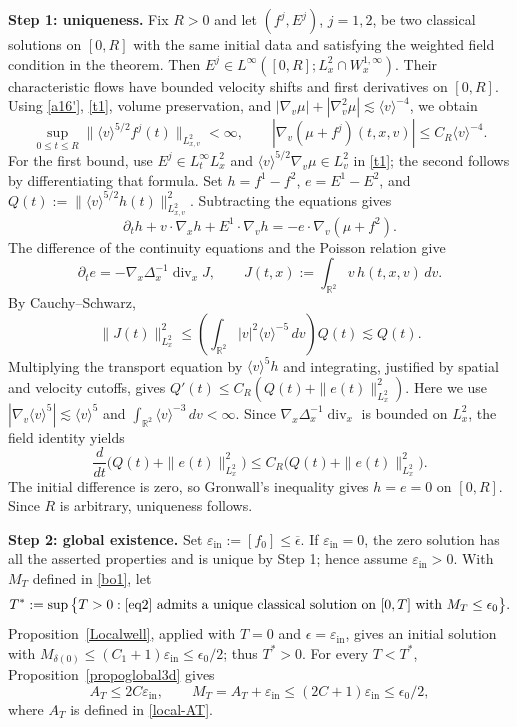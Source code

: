 \documentclass[reqno,11pt]{amsart}
\numberwithin{equation}{section}
\def\bar{\overline}
\def\bar{\overline}
\begin{document}
\textbf{Step 1: uniqueness.}
Fix $R>0$ and let $(f^j,E^j)$, $j=1,2$, be two classical solutions
on $[0,R]$ with the same initial data and satisfying the weighted
field condition in the theorem. Then
$E^j\in L^\infty([0,R];L_x^2\cap W_x^{1,\infty})$.
Their characteristic flows have bounded velocity shifts and first
derivatives on $[0,R]$. Using \eqref{a16'}, \eqref{t1}, volume
preservation, and
$|\nabla_v\mu|+|\nabla_v^2\mu|\lesssim\langle v\rangle^{-4}$, we obtain
\[
\sup_{0\leq t\leq R}
\|\langle v\rangle^{5/2}f^j(t)\|_{L^2_{x,v}}<\infty,
\qquad
|\nabla_v(\mu+f^j)(t,x,v)|\leq C_R\langle v\rangle^{-4}.
\]
For the first bound, use $E^j\in L^\infty_tL_x^2$ and
$\langle v\rangle^{5/2}\nabla_v\mu\in L_v^2$ in \eqref{t1};
the second follows by differentiating that formula. Set $h=f^1-f^2$, $e=E^1-E^2$, and
$Q(t):=\|\langle v\rangle^{5/2}h(t)\|_{L^2_{x,v}}^2$.
Subtracting the equations gives
\[
\partial_t h+v\cdot\nabla_xh+E^1\cdot\nabla_vh
=-e\cdot\nabla_v(\mu+f^2).
\]
The difference of the continuity equations and the Poisson relation give
\[
\partial_te=-\nabla_x\Delta_x^{-1}\operatorname{div}_xJ,
\qquad
J(t,x):=\int_{\mathbb R^2}v\,h(t,x,v)\,dv.
\]
By Cauchy--Schwarz,
\[
\|J(t)\|_{L_x^2}^2
\leq\left(\int_{\mathbb R^2}|v|^2\langle v\rangle^{-5}\,dv\right)Q(t)
\lesssim Q(t).
\]
Multiplying the transport equation by $\langle v\rangle^5h$ and
integrating, justified by spatial and velocity cutoffs, gives
$Q'(t)\leq C_R(Q(t)+\|e(t)\|_{L_x^2}^2)$.
Here we use $|\nabla_v\langle v\rangle^5|\lesssim\langle v\rangle^5$
and $\int_{\mathbb R^2}\langle v\rangle^{-3}\,dv<\infty$.
Since $\nabla_x\Delta_x^{-1}\operatorname{div}_x$ is bounded on $L_x^2$,
the field identity yields
\[
\frac{d}{dt}\bigl(Q(t)+\|e(t)\|_{L_x^2}^2\bigr)
\leq C_R\bigl(Q(t)+\|e(t)\|_{L_x^2}^2\bigr).
\]
The initial difference is zero, so Gronwall's inequality gives
$h=e=0$ on $[0,R]$. Since $R$ is arbitrary, uniqueness follows.
\medskip

\textbf{Step 2: global existence.}
Set $\varepsilon_{\mathrm{in}}:=[f_0]\leq\bar\epsilon$. If $\varepsilon_{\mathrm{in}}=0$, the zero solution has all
the asserted properties and is unique by Step 1; hence assume $\varepsilon_{\mathrm{in}}>0$.
With $M_T$ defined in \eqref{bo1}, let
\[
T^*:=\sup\big\{T>0:\text{\eqref{eq2} admits a unique classical
solution on $[0,T]$ with }M_T\leq\epsilon_0\big\}.
\]
Proposition~\ref{Localwell}, applied with $T=0$ and $\epsilon=\varepsilon_{\mathrm{in}}$,
gives an initial solution with
$M_{\delta(0)}\leq(C_1+1)\varepsilon_{\mathrm{in}}\leq\epsilon_0/2$; thus $T^*>0$.
For every $T<T^*$, Proposition~\ref{propoglobal3d} gives
\[
A_T\leq2C\varepsilon_{\mathrm{in}},
\qquad
M_T=A_T+\varepsilon_{\mathrm{in}}\leq(2C+1)\varepsilon_{\mathrm{in}}\leq\epsilon_0/2,
\]
where $A_T$ is defined in \eqref{local-AT}.
\end{document}
